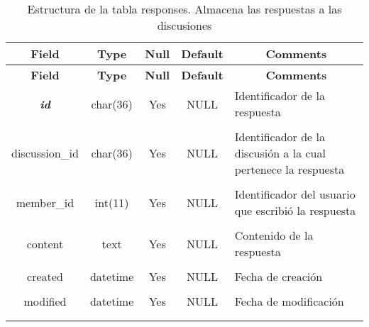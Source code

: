 %
%
\begin{longtable}{c c c c l}
	\multicolumn{1}{c}{\textbf{Field}} &
	\multicolumn{1}{c}{\textbf{Type}} &
	\multicolumn{1}{c}{\textbf{Null}} &
	\multicolumn{1}{c}{\textbf{Default}} &
	\multicolumn{1}{c}{\textbf{Comments}} \\ \hline \hline
\endfirsthead
	\multicolumn{1}{c}{\textbf{Field}} &
	\multicolumn{1}{c}{\textbf{Type}} &
	\multicolumn{1}{c}{\textbf{Null}} &
	\multicolumn{1}{c}{\textbf{Default}} &
	\multicolumn{1}{c}{\textbf{Comments}} \\ \hline \hline
\endhead \endfoot
	\textbf{\textit{id}} & char(36) & Yes & NULL & \parbox[t]{0.35\textwidth}{Identificador de la respuesta} \\ \\  \hline
	discussion\_id & char(36) & Yes & NULL & \parbox[t]{0.35\textwidth}{Identificador de la discusión a la cual pertenece la respuesta} \\ \\  \hline
	member\_id & int(11) & Yes & NULL & \parbox[t]{0.35\textwidth}{Identificador del usuario que escribió la respuesta} \\ \\  \hline
	content & text & Yes & NULL & \parbox[t]{0.35\textwidth}{Contenido de la respuesta} \\ \\  \hline
	created & datetime & Yes & NULL & \parbox[t]{0.35\textwidth}{Fecha de creación} \\ \\  \hline
	modified & datetime & Yes & NULL & \parbox[t]{0.35\textwidth}{Fecha de modificación} \\ \\  \hline
\caption[Estructura de la tabla responses]{Estructura de la tabla responses. Almacena las respuestas a las discusiones} \label{tab:forum_responses-structure} \\ 
\end{longtable}

